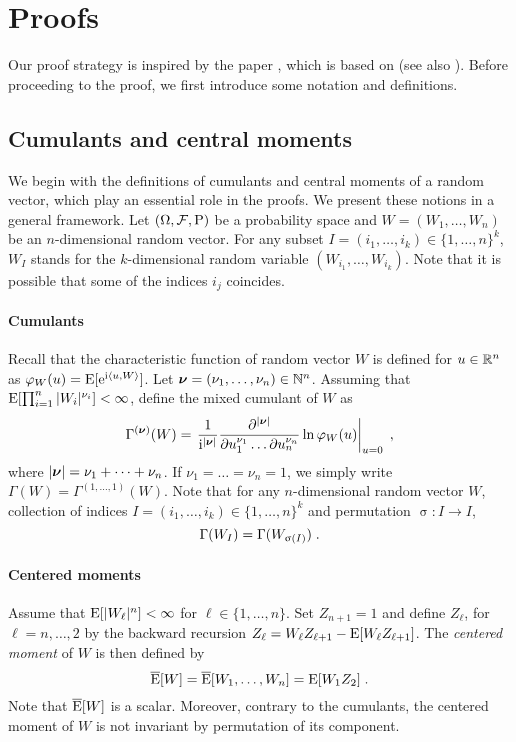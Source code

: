 
\section{Proofs}
\label{sec:proofs}
Our proof strategy is inspired by the paper \cite{doukhan2007probability}, which is based on \cite{bentkus:1980} (see also \cite{saulis:statulevicius:1991}). Before proceeding to the proof, we first introduce some  notation and definitions.

\subsection{Cumulants and central moments}
\label{sec:cumul-centr-moments}
We begin with the definitions of cumulants and central moments of a random vector, which play an essential role in the proofs. We present these notions in a general framework. Let $(\Omega,\mathcal{F},\mathrm{P})$ be a probability space and $W=(W_1,\dots,W_n)$ be an $n$-dimensional random vector. For any  subset $I =(i_1 , \ldots , i_k) \in \{1,\ldots,n\}^k$, $W_I$ stands for the $k$-dimensional random variable $(W_{i_1},\ldots,W_{i_k})$. Note that it is possible that some of the indices $i_j$ coincides.

\paragraph{Cumulants} Recall that the characteristic function of random vector $W$ is defined for $u \in \mathbb{R}^n$ as $\varphi_W(u) = \mathrm{E} [ \mathrm{e}^{\mathrm{i} \langle u,W \rangle} ]$. Let $\boldsymbol{\nu}= (\nu_1,\dots, \nu_n) \in \mathbb{N}^n$. Assuming that $\mathrm{E}[\prod_{i=1}^n |W_i|^{\nu_i}] < \infty$, define the mixed cumulant of $W$ as
\[
\Gamma^{(\boldsymbol{\nu})}(W)=\left.\frac{1}{\mathrm{i}^{|\boldsymbol{\nu}|}} \frac{\partial^{|\boldsymbol{\nu}|}}{\partial u_{1}^{\nu_{1}} \ldots \partial u_{n}^{\nu_{n}}} \ln \varphi_W(u) \right|_{u=0} \;,
\]
where $|\boldsymbol{\nu}| = \nu_1 + \dots + \nu_n$. If $\nu_1=\dots=\nu_n=1$, we simply write $\Gamma(W)= \Gamma^{(1,\dots,1)}(W)$.
Note that for any $n$-dimensional random vector $W$, collection of indices $I =(i_1,\ldots,i_k) \in \{1,\ldots,n\}^k$ and permutation $\upsigma : I \to I$,
\begin{equation}
\label{eq:inv_permuation_cumulant}
\Gamma(W_I) = \Gamma(W_{\upsigma(I)}) \;.
\end{equation}
\paragraph{Centered moments} Assume that $\mathrm{E}[|W_\ell|^n] < \infty$ for $\ell \in \{1,\dots,n\}$. Set $Z_{n+1} = 1$ and define $Z_{\ell}$, for $\ell= n, \dots, 2$ by the backward recursion
 $Z_{{\ell}} = W_{\ell} Z_{{\ell+1}} - \mathrm{E}[ W_{\ell} Z_{{\ell+1}}]$.
The \emph{centered moment} of $W$ is then  defined by
\begin{equation}
\label{eq:def_centered_moment}
\overline{\mathrm{E}}[W] = \overline{\mathrm{E}}[W_1,\dots,W_n] = \mathrm{E}[W_1 Z_{2}] \;.
\end{equation}
Note that $\overline{\mathrm{E}}[W]$ is a scalar. Moreover, contrary to the cumulants, the centered moment of $W$ is not invariant by permutation of its component.

